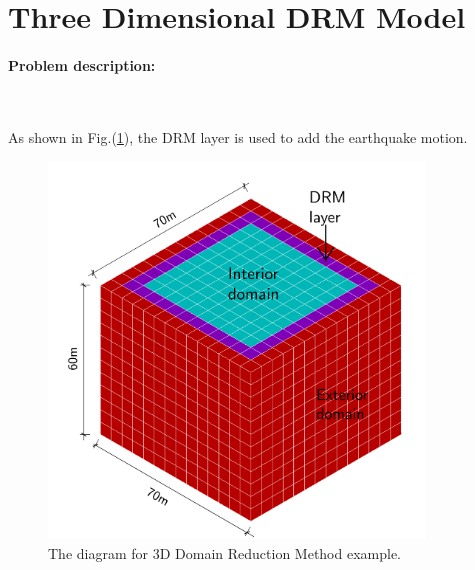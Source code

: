 \section{Three Dimensional DRM Model}

\paragraph{Problem description:} ~

As shown in Fig.(\ref{fig The diagram for Domain Reduction Method DRM }), the DRM layer is used to add the earthquake motion. 


\begin{figure}[!htb]
  \centering
  \includegraphics[width=10cm]{./Figure-files/_Chapter_Appendix_Illustrative_Examples/DRM_3D_descp_3.pdf}
  \caption{The diagram for 3D Domain Reduction Method example.}
  \label{fig The diagram for Domain Reduction Method DRM }
\end{figure}






